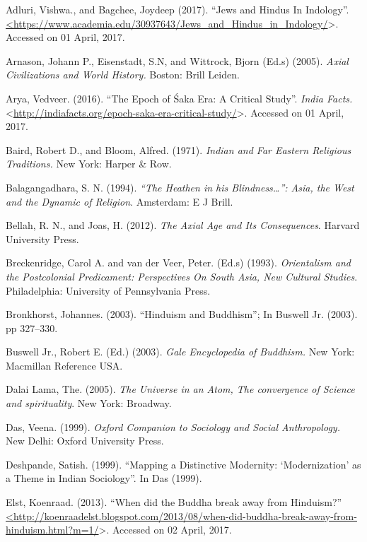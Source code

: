 \begin{thebibliography}{99}
\itemsep=1pt
 Adluri, Vishwa., and Bagchee, Joydeep (2017). “Jews and Hindus In Indology”. \url{<https://www.academia.edu/30937643/Jews_and_Hindus_in_Indology/}\textgreater . Accessed on 01 April, 2017.

  Arnason, Johann P., Eisenstadt, S.N, and Wittrock, Bjorn (Ed.s) (2005). \textit{Axial Civilizations and World History.} Boston: Brill Leiden.

  Arya, Vedveer. (2016). “The Epoch of Śaka Era: A Critical Study”. \textit{India Facts.} \textless \url{http://indiafacts.org/epoch-saka-era-critical-study/}\textgreater . Accessed on 01 April, 2017.

  Baird, Robert D., and Bloom, Alfred. (1971). \textit{Indian and Far Eastern Religious Traditions.} New York: Harper \& Row.

  Balagangadhara, S. N. (1994). \textit{“The Heathen in his Blindness…”: Asia, the West and the Dynamic of Religion}. Amsterdam: E J Brill.

  Bellah, R. N., and Joas, H. (2012). \textit{The Axial Age and Its Consequences}. Harvard University Press.

  Breckenridge, Carol A. and van der Veer, Peter. (Ed.s) (1993). \textit{Orientalism and the Postcolonial Predicament: Perspectives On South Asia, New Cultural Studies}. Philadelphia: University of Pennsylvania Press.

  Bronkhorst, Johannes. (2003). “Hinduism and Buddhism”; In Buswell Jr. (2003). pp 327--330.

  Buswell Jr., Robert E. (Ed.) (2003). \textit{Gale Encyclopedia of Buddhism.} New York: Macmillan Reference USA.

  Dalai Lama, The. (2005). \textit{The Universe in an Atom, The convergence of Science and spirituality}. New York: Broadway.

  Das, Veena. (1999). \textit{Oxford Companion to Sociology and Social Anthropology.} New Delhi: Oxford University Press.

  Deshpande, Satish. (1999). “Mapping a Distinctive Modernity: ‘Modernization’ as a Theme in Indian Sociology”. In Das (1999).

  Elst, Koenraad. (2013). “When did the Buddha break away from Hinduism?” \url{<http://koenraadelst.blogspot.com/2013/08/when-did-buddha-break-away-from-hinduism.html?m=1/}\textgreater . Accessed on 02 April, 2017.


\end{thebibliography}
